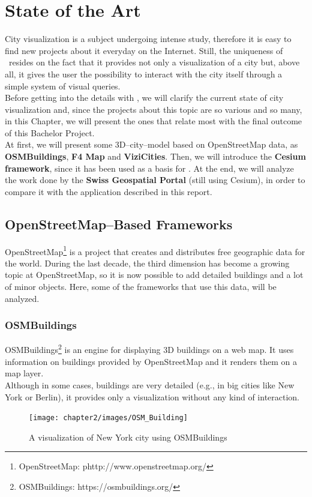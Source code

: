 \section{State of the Art} \label{stateOfTheArt}
City visualization is a subject undergoing intense study, therefore it is easy to find new projects about it everyday on the Internet. Still, the uniqueness of \applicationName\ resides on the fact that it provides not only a visualization of a city but, above all, it gives the user the possibility to interact with the city itself through a simple system of visual queries.\\

Before getting into the details with \applicationName, we will clarify the current state of city visualization and, since the projects about this topic are so various and so many, in this Chapter, we will present the ones that relate most with the final outcome of this Bachelor Project.\\

At first, we will present some 3D--city--model based on OpenStreetMap data, as {\bf OSMBuildings}, {\bf F4 Map} and {\bf ViziCities}. Then, we will introduce the {\bf Cesium framework}, since it has been used as a basis for \applicationName. At the end, we will analyze the work done by the {\bf Swiss Geospatial Portal} (still using Cesium), in order to compare it with the application described in this report. 
\subsection{OpenStreetMap--Based Frameworks}
OpenStreetMap\footnote{OpenStreetMap: phttp://www.openstreetmap.org/} is a project that creates and distributes free geographic data for the world. During the last decade, the third dimension has become a growing topic at OpenStreetMap, so it is now possible to add detailed buildings and a lot of minor objects. Here, some of the frameworks that use this data, will be analyzed.
\subsubsection{OSMBuildings}
OSMBuildings\footnote{OSMBuildings: https://osmbuildings.org/} is an engine for displaying 3D buildings on a web map. It uses information on buildings provided by OpenStreetMap and it renders them on a map layer.\\ Although in some cases, buildings are very detailed (e.g., in big cities like New York or Berlin), it provides only a visualization without any kind of interaction.
\begin{figure} [H]
\centering
\texttt{[image: chapter2/images/OSM\_Building]}
\caption{A visualization of New York city using OSMBuildings}
\label{fig:OSM_Building}
\end{figure}

